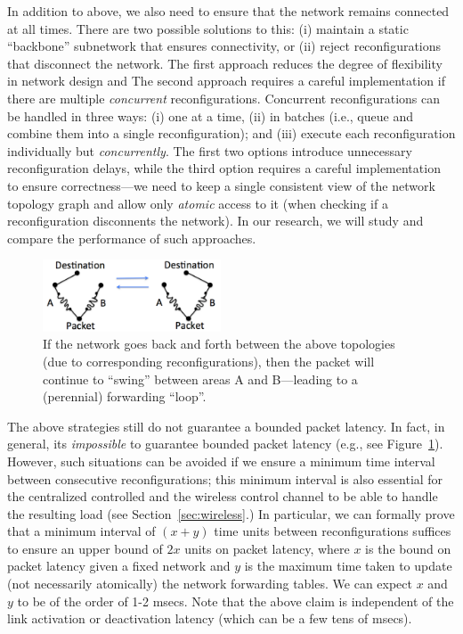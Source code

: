 In addition to above, we also need to ensure that the network remains
connected at all times. There are two possible solutions to this: (i)
maintain a static ``backbone'' subnetwork that ensures connectivity,
or (ii) reject reconfigurations that disconnect the network. The first
approach reduces the degree of flexibility in network design and
 The second approach requires
a careful implementation if there are multiple {\em concurrent}
reconfigurations. Concurrent reconfigurations can be handled in three
ways: (i) one at a time, (ii) in batches (i.e., queue and combine them
into a single reconfiguration); and (iii) execute each reconfiguration
individually but {\em concurrently}. The first two options introduce
unnecessary reconfiguration delays, while the third option requires a
careful implementation to ensure correctness---we need to keep a
single consistent view of the network topology graph and allow only
{\em atomic} access to it (when checking if a reconfiguration
disconnents the network).  In our research, we will study and compare the
performance of such approaches.

\begin{figure}
\vspace{-0.4cm}
\centering
\includegraphics[width=150pt]{PPTFigs/impossible.pdf}
\caption{If the network goes back and forth between the above
  topologies (due to corresponding reconfigurations), then the packet
  will continue to ``swing'' between areas A and B---leading to a
  (perennial) forwarding ``loop''.}
\label{fig:impossible}
\end{figure}
  The above
strategies still do not guarantee a bounded packet latency. In fact,
in general, its {\em impossible} to guarantee bounded packet latency
(e.g., see Figure~\ref{fig:impossible}). 
%
However, such situations can be avoided if we ensure a minimum time
interval between consecutive reconfigurations; this minimum interval
is also essential for the centralized controlled and the wireless
control channel to be able to handle the resulting load (see
Section~\ref{sec:wireless}.)  In particular, we can formally prove
that a minimum interval of $(x + y)$ time units between
reconfigurations suffices to ensure an upper bound of $2x$ units on
packet latency, where $x$ is the bound on packet latency given a fixed
network and $y$ is the maximum time taken to update (not necessarily
atomically) the network forwarding tables.
%
We can expect $x$ and $y$ to be of the order of 1-2 msecs. Note that
the above claim is independent of the link activation or deactivation
latency (which can be a few tens of msecs).

